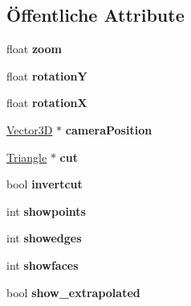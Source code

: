\subsection*{Öffentliche Attribute}
\begin{DoxyCompactItemize}
\item 
\hypertarget{structViewport__info_aeab04026de344848e9807094afb36e84}{float {\bfseries zoom}}\label{structViewport__info_aeab04026de344848e9807094afb36e84}

\item 
\hypertarget{structViewport__info_a64e7b7cbf114ec543ead86d91b26756a}{float {\bfseries rotation\-Y}}\label{structViewport__info_a64e7b7cbf114ec543ead86d91b26756a}

\item 
\hypertarget{structViewport__info_afeb27795d292ca2e7e9c6e798c277f5f}{float {\bfseries rotation\-X}}\label{structViewport__info_afeb27795d292ca2e7e9c6e798c277f5f}

\item 
\hypertarget{structViewport__info_ab27fd89845fd0c1b44aff82f53363f69}{\hyperlink{classVector3D}{Vector3\-D} $\ast$ {\bfseries camera\-Position}}\label{structViewport__info_ab27fd89845fd0c1b44aff82f53363f69}

\item 
\hypertarget{structViewport__info_a596f5507aa67421be19f2329df2b3246}{\hyperlink{classTriangle}{Triangle} $\ast$ {\bfseries cut}}\label{structViewport__info_a596f5507aa67421be19f2329df2b3246}

\item 
\hypertarget{structViewport__info_aeea9e12a7744c9462e250b9608b32710}{bool {\bfseries invertcut}}\label{structViewport__info_aeea9e12a7744c9462e250b9608b32710}

\item 
\hypertarget{structViewport__info_ac00c67cbaa72f5cfd1cc82341d3e2951}{int {\bfseries showpoints}}\label{structViewport__info_ac00c67cbaa72f5cfd1cc82341d3e2951}

\item 
\hypertarget{structViewport__info_ad56a2b77ce993319976fd610b765a136}{int {\bfseries showedges}}\label{structViewport__info_ad56a2b77ce993319976fd610b765a136}

\item 
\hypertarget{structViewport__info_add7c3d130d8315c0c0fcc14eed64183d}{int {\bfseries showfaces}}\label{structViewport__info_add7c3d130d8315c0c0fcc14eed64183d}

\item 
\hypertarget{structViewport__info_ae66c2a5bbd89cf47a280122bc15fad15}{bool {\bfseries show\-\_\-extrapolated}}\label{structViewport__info_ae66c2a5bbd89cf47a280122bc15fad15}


\end{DoxyCompactItemize}
